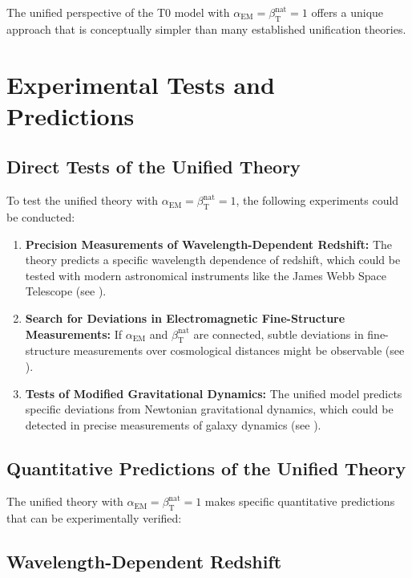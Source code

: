 \documentclass[12pt,a4paper]{article}
\newcommand{\alphaEM}{\alpha_{\text{EM}}}
\newcommand{\betaT}{\beta_{\text{T}}}
\begin{document}
	The unified perspective of the T0 model with \(\alphaEM = \betaT^{\text{nat}} = 1\) offers a unique approach that is conceptually simpler than many established unification theories.
	
	\section{Experimental Tests and Predictions}
	\label{sec:experiments}
	
	\subsection{Direct Tests of the Unified Theory}
	\label{subsec:direct_tests}
	
	To test the unified theory with \(\alphaEM = \betaT^{\text{nat}} = 1\), the following experiments could be conducted:
	
	\begin{enumerate}
		\item \textbf{Precision Measurements of Wavelength-Dependent Redshift:} The theory predicts a specific wavelength dependence of redshift, which could be tested with modern astronomical instruments like the James Webb Space Telescope (see \cite{pascher_messdifferenzen_2025}).
		
		\item \textbf{Search for Deviations in Electromagnetic Fine-Structure Measurements:} If \(\alphaEM\) and \(\betaT^{\text{nat}}\) are connected, subtle deviations in fine-structure measurements over cosmological distances might be observable (see \cite{pascher_alpha_2025}).
		
		\item \textbf{Tests of Modified Gravitational Dynamics:} The unified model predicts specific deviations from Newtonian gravitational dynamics, which could be detected in precise measurements of galaxy dynamics (see \cite{pascher_galaxies_2025}).
	\end{enumerate}
	
	\subsection{Quantitative Predictions of the Unified Theory}
	\label{subsec:quantitative_predictions}
	
	The unified theory with \(\alphaEM = \betaT^{\text{nat}} = 1\) makes specific quantitative predictions that can be experimentally verified:
	
	\subsection{Wavelength-Dependent Redshift}
	\label{subsec:wavelength_redshift}
	
\end{document}
